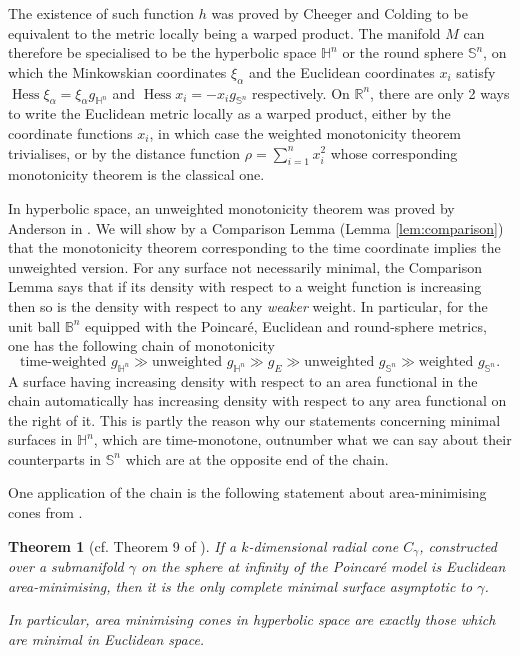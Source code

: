\documentclass[11pt]{article}
\newtheorem{theorem}{Theorem}
\DeclareMathOperator{\hess}{Hess}
\begin{document}
The existence of such function \(h\) was proved by Cheeger and Colding
\cite{Cheeger.Colding96_LowerBoundsRicci} to be equivalent to the metric locally being a warped product.
The manifold \(M\) can therefore be specialised to be the hyperbolic space \(\mathbb{H}^n\) or the round sphere \(\mathbb{S}^n\), on which the
Minkowskian coordinates \(\xi_\alpha\) and the Euclidean coordinates \(x_i\) satisfy \(\hess \xi_\alpha
  = \xi_\alpha g_{\mathbb{H}^n}\) and \(\hess x_i = -x_i g_{\mathbb{S}^n}\) respectively. 
On \(\mathbb{R}^n\), there are only 2 ways to write the
Euclidean metric locally as a warped product, either by the coordinate functions \(x_i\), in which
case the weighted monotonicity theorem trivialises, or by the distance function \(\rho
  = \sum_{i=1}^n x_i^2\) whose 
corresponding monotonicity theorem is the classical one.

In hyperbolic space, an unweighted monotonicity theorem was proved by Anderson in
\cite{Anderson82_CompleteMinimalVarieties}. We will show by a Comparison Lemma (Lemma \ref{lem:comparison}) that the
monotonicity theorem corresponding to the time coordinate implies
the unweighted version. For any surface not necessarily minimal, the Comparison Lemma
says that if its density with respect to a weight function is increasing
then so is the density with respect to any \emph{weaker}
weight. In particular, for the unit ball \(\mathbb{B}^n\) equipped
with the Poincaré, Euclidean and round-sphere metrics, one has the following chain of monotonicity
\[
   \text{time-weighted }  g_{\mathbb{H}^n} \gg   \text{unweighted } g_{\mathbb{H}^n}
   \gg g_E  \gg \text{unweighted } g_{\mathbb{S}^n}   \gg \text{weighted } g_{\mathbb{S}^n}.
  \]
A surface having increasing density with respect to an area functional in the chain
automatically has increasing density with respect to any area functional on the right of it.
This is partly the reason why our statements concerning minimal surfaces in \(\mathbb{H}^n\), which
are time-monotone, outnumber what we can say about their counterparts in \(\mathbb{S}^n\) which are at the opposite end of the chain.

One application of the chain is the following statement about area-minimising cones
from \cite{Anderson82_CompleteMinimalVarieties}.

\begin{theorem}[cf. Theorem 9 of \cite{Anderson82_CompleteMinimalVarieties}]
\label{thm:minimising-cone}
If a \(k\)-dimensional radial cone \(C_\gamma\), constructed over a submanifold \(\gamma\) on the sphere at infinity of the Poincaré model is Euclidean area-minimising,
then it is the only complete minimal surface asymptotic to \(\gamma\).

In particular, area minimising cones in hyperbolic space are exactly those which are minimal in Euclidean space.
\end{theorem}
\end{document}
